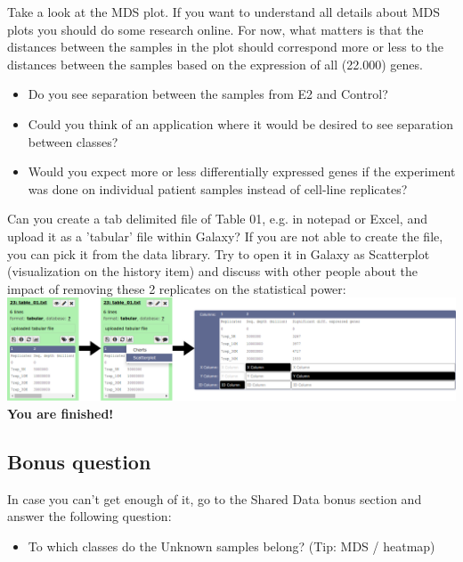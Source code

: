 \documentclass[11pt,a4paper]{article}
\begin{document}
Take a look at the MDS plot. If you want to understand all details about MDS plots you should do some research online. For now, what matters is that the distances between the samples in the plot should correspond more or less to the distances between the samples based on the expression of all (22.000) genes.
\begin{itemize}
	\item Do you see separation between the samples from E2 and Control?
	\item Could you think of an application where it would be desired to see separation between classes?
	\item Would you expect more or less differentially expressed genes if the experiment was done on individual patient samples instead of cell-line replicates?
\end{itemize}
Can you create a tab delimited file of Table 01, e.g. in notepad or Excel, and upload it as a 'tabular' file within Galaxy? If you are not able to create the file, you can pick it from the data library. Try to open it in Galaxy as Scatterplot (visualization on the history item) and discuss with other people about the impact of removing these 2 replicates on the statistical power:\\
\includegraphics[width=\textwidth]{figures/expression_04.png}\\
\textbf{You are finished!}
\subsection{Bonus question}
In case you can't get enough of it, go to the Shared Data bonus section and answer the following question:
\begin{itemize}
	\item To which classes do the Unknown samples belong? (Tip: MDS / heatmap)
\end{itemize}

%
%


\vspace{-1.5em}

\end{document}

